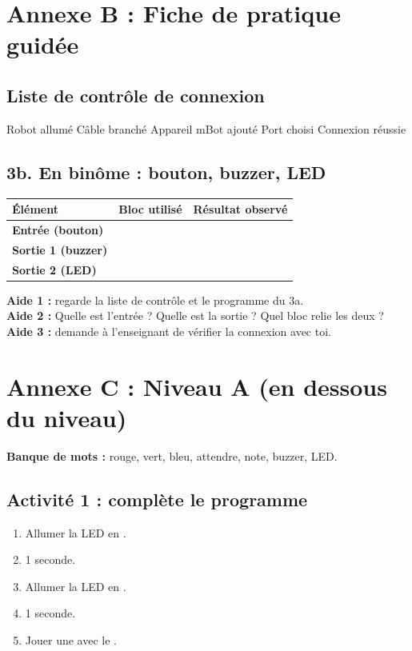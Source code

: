 \documentclass[11pt,a4paper]{article}
\begin{document}
\newpage
\section*{Annexe B : Fiche de pratique guidée}

\subsection*{Liste de contrôle de connexion}
\cb Robot allumé \quad \cb Câble branché \quad \cb Appareil mBot ajouté \quad \cb Port choisi \quad \cb Connexion réussie

\subsection*{3b. En binôme : bouton, buzzer, LED}
\begin{tabularx}{\linewidth}{>{\bfseries}p{3.4cm}Y Y}
\toprule
Élément & Bloc utilisé & Résultat observé\\
\midrule
Entrée (bouton) & & \\
Sortie 1 (buzzer) & & \\
Sortie 2 (LED) & & \\
\bottomrule
\end{tabularx}

\begin{tcolorbox}[colback=yellow!10,colframe=yellow!50!black,title={Cartes d'aide à utiliser dans l'ordre},fonttitle=\bfseries\small]
\textbf{Aide 1 :} regarde la liste de contrôle et le programme du 3a.\\
\textbf{Aide 2 :} Quelle est l'entrée ? Quelle est la sortie ? Quel bloc relie les deux ?\\
\textbf{Aide 3 :} demande à l'enseignant de vérifier la connexion avec toi.
\end{tcolorbox}

\newpage
\section*{Annexe C : Niveau A (en dessous du niveau)}

\textbf{Banque de mots :} rouge, vert, bleu, attendre, note, buzzer, LED.

\subsection*{Activité 1 : complète le programme}
\begin{enumerate}
 \item Allumer la LED en \dotfill.
 \item \dotfill{} 1 seconde.
 \item Allumer la LED en \dotfill.
 \item \dotfill{} 1 seconde.
 \item Jouer une \dotfill{} avec le \dotfill.
\end{enumerate}
\end{document}
